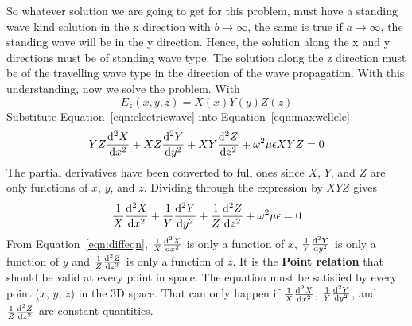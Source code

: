 So whatever solution we are going to get for this problem, must have a standing wave kind solution in the x direction with $b\rightarrow \infty$, the same is true if $a\rightarrow \infty$, the standing wave will be in the y direction. Hence, the solution along the x and y directions must be of standing wave type. The solution along the z direction must be of the travelling wave type in the direction of the wave propagation. With this understanding, now we solve the problem. With
\begin{equation}
E_z (x,y,z) = X(x)Y(y)Z(z)
\label{eqn:electricwave}
\end{equation}
Substitute Equation~\ref{eqn:electricwave} into Equation~\ref{eqn:maxwellele}
\begin{align}
YZ \dv[2]{X}{x} + XZ \dv[2]{Y}{y} + XY \dv[2]{Z}{z}+ \omega^2\mu\epsilon {XYZ} = 0
\end{align}
The partial derivatives have been converted to full ones since $X$, $Y$, and $Z$ are only functions of $x$, $y$, and $z$. Dividing through the expression by $XYZ$ gives
\begin{align}
\frac{1}{X}\dv[2] {X}{x} + \frac{1}{Y}\dv[2]{Y}{y} + \frac{1}{Z} \dv[2]{Z}{z} + \omega^2\mu\epsilon = 0
\label{eqn:diffeqn}
\end{align}
From Equation~\eqref{eqn:diffeqn}, $\frac{1}{X}\dv[2] {X}{x}$ is only a function of $x$, $\frac{1}{Y}\dv[2]{Y}{y}$ is only a function of $y$ and $\frac{1}{Z} \dv[2]{Z}{z}$ is only a function of $z$. It is the \textbf{Point relation} that should be valid at every point in space. The equation must be satisfied by every point ($x$, $y$, $z$) in the 3D space. That can only happen if $\frac{1}{X}\dv[2] {X}{x}$, $\frac{1}{Y}\dv[2]{Y}{y}$, and $\frac{1}{Z} \dv[2]{Z}{z}$ are constant quantities.

